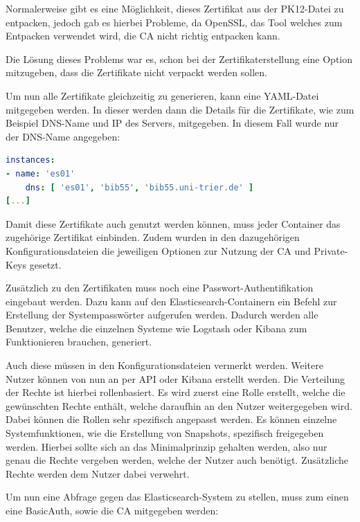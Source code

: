 Normalerweise gibt es eine Möglichkeit, dieses Zertifikat aus der PK12-Datei zu entpacken, jedoch gab es hierbei Probleme, da OpenSSL, das Tool welches zum Entpacken verwendet wird, die CA nicht richtig entpacken kann. \cite{nerophon.2018}

Die Lösung dieses Problems war es, schon bei der Zertifikaterstellung eine Option mitzugeben, dass die Zertifikate nicht verpackt werden sollen. 

Um nun alle Zertifikate gleichzeitig zu generieren, kann eine YAML-Datei mitgegeben werden. In dieser werden dann die Details für die Zertifikate, wie zum Beispiel DNS-Name und IP des Servers, mitgegeben. In diesem Fall wurde nur der DNS-Name angegeben:
\newpage

\begin{lstlisting}[language=YAML, frame=single, label={lst:certs-yml}, caption=Auschnitt aus der Konfigurationsdatei für die Zertifikatgenerierung,captionpos=b] 
instances:
- name: 'es01'
	dns: [ 'es01', 'bib55', 'bib55.uni-trier.de' ]
[...]
\end{lstlisting}

Damit diese Zertifikate auch genutzt werden können, muss jeder Container das zugehörige Zertifikat einbinden. Zudem wurden in den dazugehörigen Konfigurationsdateien die jeweiligen Optionen zur Nutzung der CA und Private-Keys gesetzt.

Zusätzlich zu den Zertifikaten muss noch eine Passwort-Authentifikation eingebaut werden. Dazu kann auf den Elasticsearch-Containern ein Befehl zur Erstellung der Systempasswörter aufgerufen werden. Dadurch werden alle Benutzer, welche die einzelnen Systeme wie Logstash oder Kibana zum Funktionieren brauchen, generiert.

Auch diese müssen in den Konfigurationsdateien vermerkt werden. Weitere Nutzer können von nun an per API oder Kibana erstellt werden. Die Verteilung der Rechte ist hierbei rollenbasiert. Es wird zuerst eine Rolle erstellt, welche die gewünschten Rechte enthält, welche daraufhin an den Nutzer weitergegeben wird. Dabei können die Rollen sehr spezifisch angepasst werden. Es können einzelne Systemfunktionen, wie die Erstellung von Snapshots, spezifisch freigegeben werden. Hierbei sollte sich an das Minimalprinzip gehalten werden, also nur genau die Rechte vergeben werden, welche der Nutzer auch benötigt. Zusätzliche Rechte werden dem Nutzer dabei verwehrt.

Um nun eine Abfrage gegen das Elasticsearch-System zu stellen, muss zum einen eine BasicAuth, sowie die CA mitgegeben werden:

